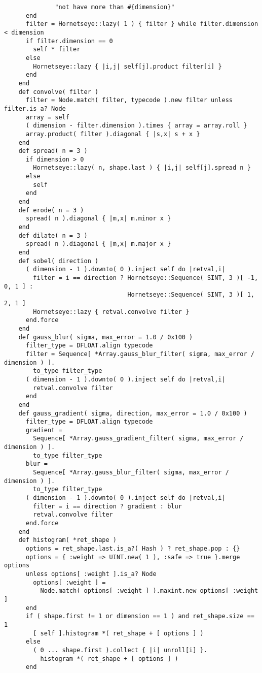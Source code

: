 \begin{lstlisting}
              "not have more than #{dimension}"
      end
      filter = Hornetseye::lazy( 1 ) { filter } while filter.dimension < dimension
      if filter.dimension == 0
        self * filter
      else
        Hornetseye::lazy { |i,j| self[j].product filter[i] }
      end
    end
    def convolve( filter )
      filter = Node.match( filter, typecode ).new filter unless filter.is_a? Node
      array = self
      ( dimension - filter.dimension ).times { array = array.roll }
      array.product( filter ).diagonal { |s,x| s + x }
    end
    def spread( n = 3 )
      if dimension > 0
        Hornetseye::lazy( n, shape.last ) { |i,j| self[j].spread n }
      else
        self
      end
    end
    def erode( n = 3 )
      spread( n ).diagonal { |m,x| m.minor x }
    end
    def dilate( n = 3 )
      spread( n ).diagonal { |m,x| m.major x }
    end
    def sobel( direction )
      ( dimension - 1 ).downto( 0 ).inject self do |retval,i|
        filter = i == direction ? Hornetseye::Sequence( SINT, 3 )[ -1, 0, 1 ] :
                                  Hornetseye::Sequence( SINT, 3 )[ 1, 2, 1 ]
        Hornetseye::lazy { retval.convolve filter }
      end.force
    end
    def gauss_blur( sigma, max_error = 1.0 / 0x100 )
      filter_type = DFLOAT.align typecode
      filter = Sequence[ *Array.gauss_blur_filter( sigma, max_error / dimension ) ].
        to_type filter_type
      ( dimension - 1 ).downto( 0 ).inject self do |retval,i|
        retval.convolve filter
      end
    end
    def gauss_gradient( sigma, direction, max_error = 1.0 / 0x100 )
      filter_type = DFLOAT.align typecode
      gradient =
        Sequence[ *Array.gauss_gradient_filter( sigma, max_error / dimension ) ].
        to_type filter_type
      blur =
        Sequence[ *Array.gauss_blur_filter( sigma, max_error / dimension ) ].
        to_type filter_type
      ( dimension - 1 ).downto( 0 ).inject self do |retval,i|
        filter = i == direction ? gradient : blur
        retval.convolve filter
      end.force
    end
    def histogram( *ret_shape )
      options = ret_shape.last.is_a?( Hash ) ? ret_shape.pop : {}
      options = { :weight => UINT.new( 1 ), :safe => true }.merge options
      unless options[ :weight ].is_a? Node
        options[ :weight ] =
          Node.match( options[ :weight ] ).maxint.new options[ :weight ]
      end
      if ( shape.first != 1 or dimension == 1 ) and ret_shape.size == 1
        [ self ].histogram *( ret_shape + [ options ] )
      else
        ( 0 ... shape.first ).collect { |i| unroll[i] }.
          histogram *( ret_shape + [ options ] )
      end

\end{lstlisting}
